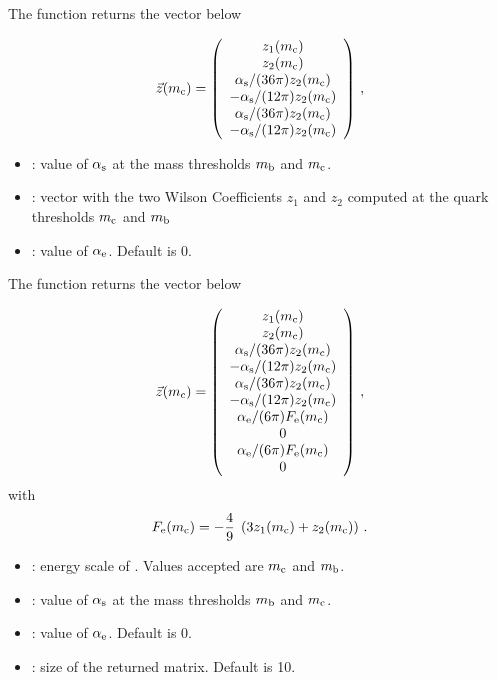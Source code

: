 The function  returns the vector below

\begin{equation}
\vec{z} (m_{\mathrm c}) =
\left( \begin{array}{c}
z_1 (m_{\mathrm c}) \\ z_2 (m_{\mathrm c}) \\
\alpha_{\mathrm s}/(36\pi) z_2 (m_{\mathrm c}) \\
-\alpha_{\mathrm s}/(12 \pi) z_2 (m_{\mathrm c}) \\
\alpha_{\mathrm s}/(36\pi) z_2 (m_{\mathrm c}) \\
-\alpha_{\mathrm s}/(12 \pi) z_2 (m_{\mathrm c}) 
\end{array} \right) \, ,
\label{eq:zmc:1010}
\end{equation}


\begin{itemize}
\item {}: value of $\alpha_{\mathrm s}$ at the mass thresholds $m_{\mathrm b}$ and $m_{\mathrm c}$.
\item {}: vector with the two Wilson Coefficients $z_1$ and $z_2$ computed at the
quark thresholds $m_{\mathrm c}$ and $m_{\mathrm b}$
\item {}: value of $\alpha_{\mathrm e}$. Default is 0.
\end{itemize}

The function  returns the vector below 

\begin{equation}
\vec{z} (m_{\mathrm c}) =
\left( \begin{array}{c}
z_1 (m_{\mathrm c}) \\ z_2 (m_{\mathrm c}) \\
\alpha_{\mathrm s}/(36\pi) z_2 (m_{\mathrm c}) \\
-\alpha_{\mathrm s}/(12 \pi) z_2 (m_{\mathrm c}) \\
\alpha_{\mathrm s}/(36\pi) z_2 (m_{\mathrm c}) \\
-\alpha_{\mathrm s}/(12 \pi) z_2 (m_{\mathrm c}) \\
\alpha_{\mathrm e}/(6\pi) F_{ \mathrm e} (m_{\mathrm c}) \\  0  \\
\alpha_{\mathrm e}/(6\pi) F_{ \mathrm e} (m_{\mathrm c}) \\  0
\end{array} \right) \, ,
\label{eq:zmc:1010}
\end{equation}
with 
\begin{equation}
F_{ \mathrm e} (m_{\mathrm c}) =
-\frac{4}{9} \; \left( 3 z_1(m_{\mathrm c}) + z_2(m_{\mathrm c}) \right) \, .
\label{eq:Femc}
\end{equation}



\begin{itemize}
\item {}: energy scale of . Values accepted are $m_{\mathrm c}$ and $m_{\mathrm b}$.
\item {}: value of $\alpha_{\mathrm s}$ at the mass thresholds $m_{\mathrm b}$ and $m_{\mathrm c}$.
\item {}: value of $\alpha_{\mathrm e}$. Default is 0.
\item {}: size of the returned matrix. Default is 10.
\end{itemize}

